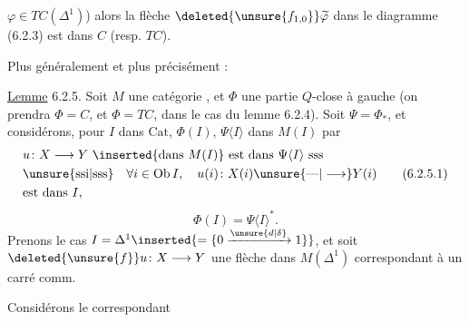 $\varphi\in TC(\Delta^1)$) alors la flèche $\deleted{\unsure{f_{1,0}}}\widetilde{\varphi}$ dans
le diagramme (6.2.3) est dans $C$ (resp. $TC$).

Plus généralement et plus précisément :

\uline{Lemme} 6.2.5. Soit $M$ une catégorie ,
et $\Phi$ une partie $Q$-close à gauche
(on prendra $\Phi=C$, et $\Phi=TC$, dans le cas
du lemme 6.2.4).  Soit
$\Psi=\Phi_*$, et considérons, pour  
$I$ dans $\mathrm{Cat}$, $\Phi(I)$, $\Psi\langle I\rangle$ dans $M(I)$
 par
\[
 \begin{aligned}
 &u\colon X\longrightarrow Y\ \inserted{\text{dans }M(I)}\ \text{est dans }\Psi\langle I\rangle\ \text{sss}\\
 &\text{\unsure{ssi|sss}}\quad \forall i\in\operatorname{Ob} I,\quad u(i)\colon X(i)\unsure{\text{---}|\longrightarrow}Y(i)\\
 &\text{est dans }I,
 \end{aligned}\tag*{(6.2.5.1)}
\]
\[
 \Phi(I)=\Psi\langle I\rangle^*.\tag*{(6.2.5.2)}
\]
Prenons le cas $I=\Delta^1\inserted{=\{0\xrightarrow{\unsure{d|\delta}}1\}}$, et soit
$\deleted{\unsure{f}}u\colon X\longrightarrow Y$ une flèche dans $M(\Delta^1)$
correspondant à un carré comm.


Considérons le  correspondant


